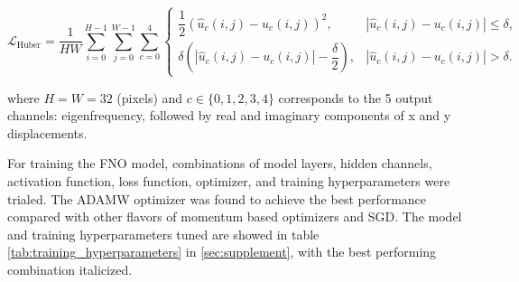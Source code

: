 \documentclass[preprint,review,12pt]{elsarticle}
\begin{document}
\begin{equation*}
\mathcal{L}_{\text{Huber}}
=
\frac{1}{HW}
\sum_{i=0}^{H-1}
\sum_{j=0}^{W-1}
\sum_{c=0}^{4}
\begin{cases}
\dfrac{1}{2}\left(\hat{u}_c(i,j)-u_c(i,j)\right)^2,
&
\left|\hat{u}_c(i,j)-u_c(i,j)\right|\le\delta,
\\[2ex]
\delta\left(
\left|\hat{u}_c(i,j)-u_c(i,j)\right|
-\dfrac{\delta}{2}
\right),
&
\left|\hat{u}_c(i,j)-u_c(i,j)\right|>\delta.
\end{cases}
\end{equation*}


where $H = W = 32$ (pixels) and $c \in \{0,1,2,3,4\}$ corresponds to the 5 output channels: eigenfrequency, followed by real and imaginary components of x and y displacements.

For training the FNO model, combinations of model layers, hidden channels, activation function, loss function, optimizer, and training hyperparameters were trialed. The ADAMW optimizer was found to achieve the best performance compared with other flavors of momentum based optimizers and SGD. The model and training hyperparameters tuned are showed in table \ref{tab:training_hyperparameters} in \ref{sec:supplement}, with the best performing combination italicized.

\end{document}
